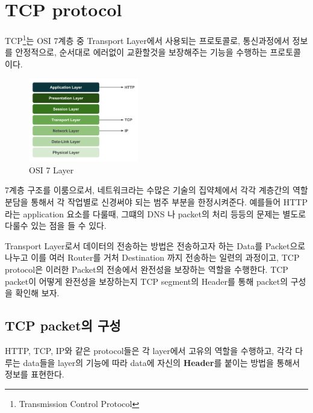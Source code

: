 \section{TCP protocol}
TCP\footnote{Transmission Control Protocol}는 OSI 7계층 중 Transport Layer에서 사용되는 프로토콜로, 통신과정에서 정보를 안정적으로, 순서대로 에러없이 교환할것을 보장해주는 기능을 수행하는 프로토콜이다.\\
\vspace{-4mm}  
\begin{figure} \vspace{-20pt}
\begin{center}
\includegraphics[width=0.43\textwidth]{image/week01/1-1.png}    
\end{center}
\vspace{-20pt}
\caption{\small OSI 7 Layer}
\vspace{-10pt}
\end{figure}
7계층 구조를 이룸으로서, 네트워크라는 수많은 기술의 집약체에서 각각 계층간의 역할 분담을 통해서 각 작업별로 신경써야 되는 범주 부분을 한정시켜준다. 
예를들어 HTTP 라는 application 요소를 다룰때, 그떄의 DNS 나 packet의 처리 등등의 문제는 별도로 다룰수 있는 점을 들 수 있다. 

Transport Layer로서 데이터의 전송하는 방법은 전송하고자 하는 Data를 Packet으로 나누고 이를 여러 Router를 거처 Destination 까지 전송하는 일련의 과정이고, TCP protocol은 이러한 Packet의 전송에서 완전성을 보장하는 역할을 수행한다. TCP packet이 어떻게 완전성을 보장하는지 TCP segment의 Header를 통해 packet의 구성을 확인해 보자.
\subsection{TCP packet의 구성}
    HTTP, TCP, IP와 같은 protocol들은 각 layer에서 고유의 역할을 수행하고, 각각 다루는 data들을 layer의 기능에 따라 data에 자신의 \textbf{Header}를 붙이는 방법을 통해서 정보를 표현한다. 
    
